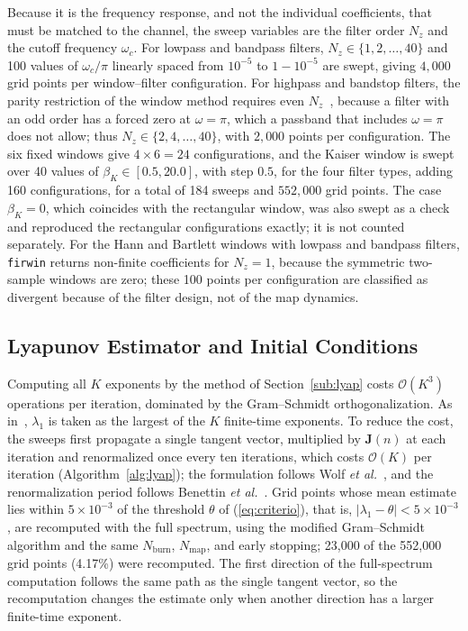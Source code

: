 \documentclass[journal]{IEEEtran}
\begin{document}
Because it is the frequency response, and not the individual coefficients,
that must be matched to the channel, the sweep
variables are the filter order $N_z$ and the cutoff frequency $\omega_c$. For
lowpass and bandpass filters, $N_z\in\{1,2,\ldots,40\}$ and 100 values of
$\omega_c/\pi$ linearly spaced from $10^{-5}$ to $1-10^{-5}$ are swept, giving
$4{,}000$ grid points per window--filter configuration. For highpass and
bandstop filters, the parity restriction of the window method requires even
$N_z$~\cite{Oppenheim2009}, because a filter with an odd order has a forced
zero at $\omega=\pi$, which a passband that includes $\omega=\pi$ does not
allow; thus
$N_z\in\{2,4,\ldots,40\}$, with $2{,}000$ points per configuration. The six
fixed windows give $4\times6=24$ configurations, and the Kaiser window is
swept over 40 values of $\beta_K\in[0.5,20.0]$, with step $0.5$, for the four
filter types, adding 160 configurations, for a total of 184 sweeps and
$552{,}000$ grid points. The case $\beta_K=0$, which coincides with the
rectangular window, was also swept as a check and reproduced the rectangular
configurations exactly; it is not counted separately. For the Hann and Bartlett windows with lowpass and
bandpass filters, \texttt{firwin} returns non-finite coefficients for $N_z=1$, because the
symmetric two-sample windows are zero; these 100 points per configuration are
classified as divergent because of the filter design, not of the map dynamics.

\subsection{Lyapunov Estimator and Initial Conditions}\label{sub:estimator}
Computing all $K$ exponents by the method of Section~\ref{sub:lyap} costs
$\mathcal{O}(K^3)$ operations per iteration, dominated by the Gram--Schmidt
orthogonalization. As in~\cite{BorgesCNSNS2024}, $\lambda_1$ is taken as the
largest of the $K$ finite-time exponents. To reduce the cost, the sweeps first
propagate a single tangent vector, multiplied by $\mathbf{J}(n)$ at each
iteration and renormalized once every ten iterations, which costs
$\mathcal{O}(K)$ per iteration (Algorithm~\ref{alg:lyap}); the formulation
follows Wolf \textit{et al.}~\cite{Wolf1985}, and the renormalization period
follows Benettin \textit{et al.}~\cite{Benettin1980a,Benettin1980b}. Grid points whose mean estimate lies within $5\times10^{-3}$ of the threshold
$\theta$ of (\ref{eq:criterio}), that is, $|\lambda_1-\theta|<5\times10^{-3}$,
are recomputed with the full spectrum, using the modified Gram--Schmidt
algorithm and the same $N_{\text{burn}}$, $N_\text{map}$, and early stopping;
23,000 of the 552,000 grid points (4.17\%) were recomputed. The first
direction of the full-spectrum computation follows the same path as the single
tangent vector, so the recomputation changes the estimate only when another
direction has a larger finite-time exponent.
\end{document}
